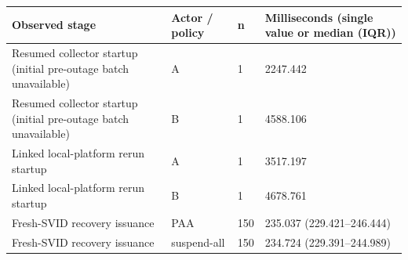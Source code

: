 \begin{tabular}{llll}
\hline
Observed stage & Actor / policy & n & Milliseconds (single value or median (IQR)) \\
\hline
Resumed collector startup (initial pre-outage batch unavailable) & A & 1 & 2247.442 \\
Resumed collector startup (initial pre-outage batch unavailable) & B & 1 & 4588.106 \\
Linked local-platform rerun startup & A & 1 & 3517.197 \\
Linked local-platform rerun startup & B & 1 & 4678.761 \\
Fresh-SVID recovery issuance & PAA & 150 & 235.037 (229.421--246.444) \\
Fresh-SVID recovery issuance & suspend-all & 150 & 234.724 (229.391--244.989) \\
\hline
\end{tabular}
